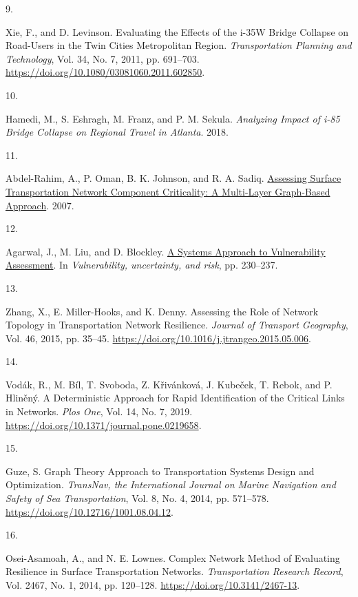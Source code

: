 \documentclass[
  letterpaper,
]{trb}
\newlength{\cslhangindent}
\newlength{\csllabelwidth}
\newlength{\cslentryspacingunit} %
\newenvironment{CSLReferences}[2] %
 {%
  \setlength{\parindent}{0pt}
  \ifodd #1
  \let\oldpar\par
  \def\par{\hangindent=\cslhangindent\oldpar}
  \fi
  \setlength{\parskip}{#2\cslentryspacingunit}
 }%
 {}
\newcommand{\CSLLeftMargin}[1]{\parbox[t]{\csllabelwidth}{#1}}
\newcommand{\CSLRightInline}[1]{\parbox[t]{\linewidth - \csllabelwidth}{#1}\break}
\begin{document}
\begin{CSLReferences}{0}{0}
\leavevmode{}%
\CSLLeftMargin{9. }%
\CSLRightInline{Xie, F., and D. Levinson. Evaluating the Effects of the
i-35W Bridge Collapse on Road-Users in the Twin Cities Metropolitan
Region. \emph{Transportation Planning and Technology}, Vol. 34, No. 7,
2011, pp. 691--703. \url{https://doi.org/10.1080/03081060.2011.602850}.}

\leavevmode{}%
\CSLLeftMargin{10. }%
\CSLRightInline{Hamedi, M., S. Eshragh, M. Franz, and P. M. Sekula.
\emph{Analyzing Impact of i-85 Bridge Collapse on Regional Travel in
Atlanta}. 2018.}

\leavevmode{}%
\CSLLeftMargin{11. }%
\CSLRightInline{Abdel-Rahim, A., P. Oman, B. K. Johnson, and R. A.
Sadiq. \href{https://doi.org/10.1109/ITSC.2007.4357801}{Assessing
Surface Transportation Network Component Criticality: A Multi-Layer
Graph-Based Approach}. 2007.}

\leavevmode{}%
\CSLLeftMargin{12. }%
\CSLRightInline{Agarwal, J., M. Liu, and D. Blockley.
\href{https://doi.org/10.1061/41170(400)28}{A Systems Approach to
Vulnerability Assessment}. In \emph{Vulnerability, uncertainty, and
risk}, pp. 230--237.}

\leavevmode{}%
\CSLLeftMargin{13. }%
\CSLRightInline{Zhang, X., E. Miller-Hooks, and K. Denny. Assessing the
Role of Network Topology in Transportation Network Resilience.
\emph{Journal of Transport Geography}, Vol. 46, 2015, pp. 35--45.
\url{https://doi.org/10.1016/j.jtrangeo.2015.05.006}.}

\leavevmode{}%
\CSLLeftMargin{14. }%
\CSLRightInline{Vodák, R., M. Bíl, T. Svoboda, Z. Křivánková, J.
Kubeček, T. Rebok, and P. Hliněný. A Deterministic Approach for Rapid
Identification of the Critical Links in Networks. \emph{Plos One}, Vol.
14, No. 7, 2019. \url{https://doi.org/10.1371/journal.pone.0219658}.}

\leavevmode{}%
\CSLLeftMargin{15. }%
\CSLRightInline{Guze, S. Graph Theory Approach to Transportation Systems
Design and Optimization. \emph{TransNav, the International Journal on
Marine Navigation and Safety of Sea Transportation}, Vol. 8, No. 4,
2014, pp. 571--578. \url{https://doi.org/10.12716/1001.08.04.12}.}

\leavevmode{}%
\CSLLeftMargin{16. }%
\CSLRightInline{Osei-Asamoah, A., and N. E. Lownes. Complex Network
Method of Evaluating Resilience in Surface Transportation Networks.
\emph{Transportation Research Record}, Vol. 2467, No. 1, 2014, pp.
120--128. \url{https://doi.org/10.3141/2467-13}.}


\end{CSLReferences}
\end{document}
